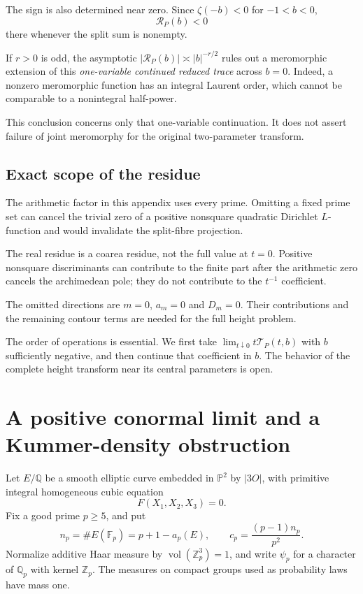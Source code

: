 \documentclass[11pt]{article}
\begin{document}
The sign is also determined near zero.
Since $\zeta(-b)<0$ for $-1<b<0$,
\[
\mathcal R_P(b)<0
\]
there whenever the split sum is nonempty.

If $r>0$ is odd, the asymptotic
$|\mathcal R_P(b)|\asymp|b|^{-r/2}$
rules out a meromorphic extension of
this \emph{one-variable continued
reduced trace} across $b=0$.
Indeed, a nonzero meromorphic function
has an integral Laurent order, which
cannot be comparable to a nonintegral
half-power.

This conclusion concerns only that
one-variable continuation. It does not
assert failure of joint meromorphy for
the original two-parameter transform.

\subsection{Exact scope of the residue}

The arithmetic factor in this appendix
uses every prime. Omitting a fixed
prime set can cancel the trivial zero
of a positive nonsquare quadratic
Dirichlet $L$-function and would
invalidate the split-fibre projection.

The real residue is a coarea residue,
not the full value at $t=0$.
Positive nonsquare discriminants can
contribute to the finite part after
the arithmetic zero cancels the
archimedean pole; they do not contribute
to the $t^{-1}$ coefficient.

The omitted directions are $m=0$, $a_m=0$ and $D_m=0$.
Their contributions and the remaining contour terms are needed for
the full height problem.

The order of operations is essential. We first take
$\lim_{t\downarrow0}t\mathcal T_P(t,b)$ with $b$ sufficiently negative,
and then continue that coefficient in $b$. The behavior of the
complete height transform near its central parameters is open.


\section{A positive conormal limit and a Kummer-density obstruction}
\label{app:conormal}

Let $E/\mathbb Q$ be a smooth elliptic curve embedded
in $\mathbb P^2$ by $|3O|$, with primitive integral
homogeneous cubic equation
\[
F(X_1,X_2,X_3)=0.
\]
Fix a good prime $p\ge5$, and put
\[
n_p=\#E(\mathbb F_p)=p+1-a_p(E),\qquad
c_p=\frac{(p-1)n_p}{p^2}.
\]
Normalize additive Haar measure by $\operatorname{vol}(\mathbb Z_p^3)=1$, and write $\psi_p$ for a character of $\mathbb Q_p$ with kernel $\mathbb Z_p$. The measures on compact groups used as probability laws have mass one.
\end{document}
